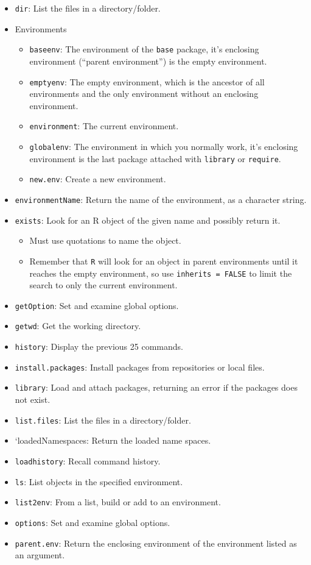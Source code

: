 \documentclass[]{book}
\providecommand{\tightlist}{%
  \setlength{\itemsep}{0pt}\setlength{\parskip}{0pt}}
\begin{document}
\begin{itemize}
\tightlist
\item
  \texttt{dir}: List the files in a directory/folder.
\item
  Environments

  \begin{itemize}
  \tightlist
  \item
    \texttt{baseenv}: The environment of the \texttt{base} package, it's enclosing environment (``parent environment'') is the empty environment.
  \item
    \texttt{emptyenv}: The empty environment, which is the ancestor of all environments and the only environment without an enclosing environment.
  \item
    \texttt{environment}: The current environment.
  \item
    \texttt{globalenv}: The environment in which you normally work, it's enclosing environment is the last package attached with \texttt{library} or \texttt{require}.
  \item
    \texttt{new.env}: Create a new environment.
  \end{itemize}
\item
  \texttt{environmentName}: Return the name of the environment, as a character string.
\item
  \texttt{exists}: Look for an R object of the given name and possibly return it.

  \begin{itemize}
  \tightlist
  \item
    Must use quotations to name the object.
  \item
    Remember that \texttt{R} will look for an object in parent environments until it reaches the empty environment, so use \texttt{inherits\ =\ FALSE} to limit the search to only the current environment.
  \end{itemize}
\item
  \texttt{getOption}: Set and examine global options.
\item
  \texttt{getwd}: Get the working directory.
\item
  \texttt{history}: Display the previous 25 commands.
\item
  \texttt{install.packages}: Install packages from repositories or local files.
\item
  \texttt{library}: Load and attach packages, returning an error if the packages does not exist.
\item
  \texttt{list.files}: List the files in a directory/folder.
\item
  `loadedNamespaces: Return the loaded name spaces.
\item
  \texttt{loadhistory}: Recall command history.
\item
  \texttt{ls}: List objects in the specified environment.
\item
  \texttt{list2env}: From a list, build or add to an environment.
\item
  \texttt{options}: Set and examine global options.
\item
  \texttt{parent.env}: Return the enclosing environment of the environment listed as an argument.


\end{itemize}
\end{document}
